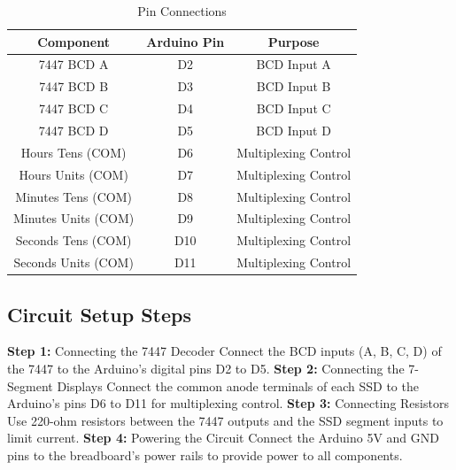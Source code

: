 \documentclass[12pt]{article}
\begin{document}
	\begin{table}[h]
		\centering
		\caption{Pin Connections}
		\begin{tabular}{|c|c|c|}
			\hline
			Component & Arduino Pin & Purpose \\
			\hline
			7447 BCD A & D2 & BCD Input A \\
			7447 BCD B & D3 & BCD Input B \\
			7447 BCD C & D4 & BCD Input C \\
			7447 BCD D & D5 & BCD Input D \\
			\hline
			Hours Tens (COM) & D6 & Multiplexing Control \\
			Hours Units (COM) & D7 & Multiplexing Control \\
			Minutes Tens (COM) & D8 & Multiplexing Control \\
			Minutes Units (COM) & D9 & Multiplexing Control \\
			Seconds Tens (COM) & D10 & Multiplexing Control \\
			Seconds Units (COM) & D11 & Multiplexing Control \\
			\hline
		\end{tabular}
	\end{table}
	\subsection{Circuit Setup Steps}
	\textbf{Step 1:} Connecting the 7447 Decoder\newline
	Connect the BCD inputs (A, B, C, D) of the 7447 to the Arduino's digital pins D2 to D5.\newline
	\textbf{Step 2:} Connecting the 7-Segment Displays\newline
	Connect the common anode terminals of each SSD to the Arduino’s pins D6 to D11 for multiplexing control.\newline
	\textbf{Step 3:} Connecting Resistors\newline
	Use 220-ohm resistors between the 7447 outputs and the SSD segment inputs to limit current.\newline
	\textbf{Step 4:} Powering the Circuit\newline
	Connect the Arduino 5V and GND pins to the breadboard’s power rails to provide power to all components.\newline
\end{document}
